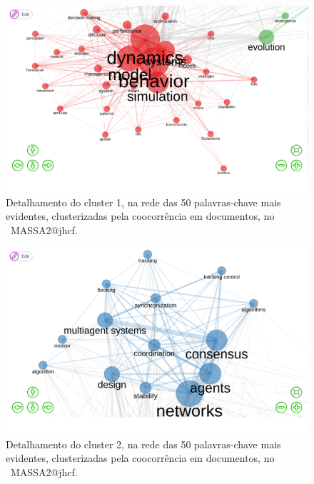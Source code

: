 \begin{figure}
    \centering
    \includegraphics[width=1\textwidth]{experiments/jhcf/PesqBibliogr/SimulacaoMultiagente/WoS-20220203/Estrutura/Conceitual/MASSA2-Cluster1-Co-occurrence-Network-50nodes-louvainclustering.png.png}
    \caption{Detalhamento do cluster 1, na rede das 50 palavras-chave mais evidentes, clusterizadas pela coocorrência em documentos, no  \dataset\ MASSA2@jhcf.}
    \label{fig:MASSA2-Cluster1-Co-occurrence-Network-50nodes-louvainclustering.png}
\end{figure}

\begin{figure}
    \centering
    \includegraphics[width=1\textwidth]{experiments/jhcf/PesqBibliogr/SimulacaoMultiagente/WoS-20220203/Estrutura/Conceitual/MASSA2-Cluster2-Co-occurrence-Network-50nodes-louvainclustering.png.png.png}
    \caption{Detalhamento do cluster 2, na rede das 50 palavras-chave mais evidentes, clusterizadas pela coocorrência em documentos, no  \dataset\ MASSA2@jhcf.}
    \label{fig:MASSA2-Cluster2-Co-occurrence-Network-50nodes-louvainclustering.png.png}
\end{figure}


